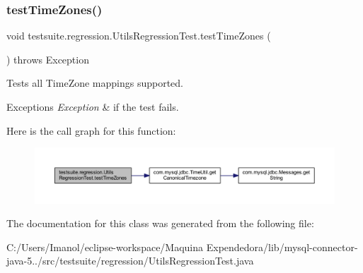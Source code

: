 \subsubsection{\texorpdfstring{test\+Time\+Zones()}{testTimeZones()}}
{\footnotesize\ttfamily void testsuite.\+regression.\+Utils\+Regression\+Test.\+test\+Time\+Zones (\begin{DoxyParamCaption}{ }\end{DoxyParamCaption}) throws Exception}

Tests all Time\+Zone mappings supported.


\begin{DoxyExceptions}{Exceptions}
{\em Exception} & if the test fails. \\
\hline
\end{DoxyExceptions}
Here is the call graph for this function\+:
\nopagebreak
\begin{figure}[H]
\begin{center}
\leavevmode
\includegraphics[width=350pt]{classtestsuite_1_1regression_1_1_utils_regression_test_a23afa0e1c5288ab757fb3e4c09676f79_cgraph}
\end{center}
\end{figure}


The documentation for this class was generated from the following file\+:\begin{DoxyCompactItemize}
\item 
C\+:/\+Users/\+Imanol/eclipse-\/workspace/\+Maquina Expendedora/lib/mysql-\/connector-\/java-\/5../src/testsuite/regression/Utils\+Regression\+Test.\+java\end{DoxyCompactItemize}
